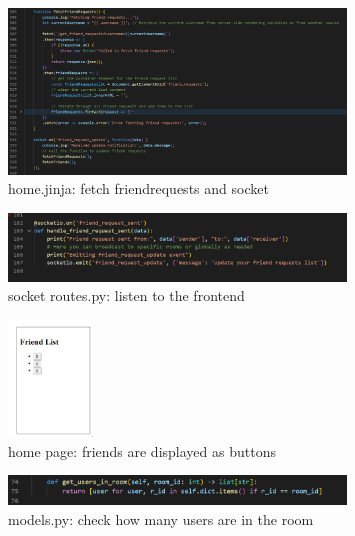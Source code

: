 \documentclass[12pt]{article}
\begin{document}
\begin{enumerate}
		\begin{figure}[H]
                \centering
                \includegraphics[width=0.8\textwidth]{zzrgraphs/home_fetchfriendrequests.png}
                \caption{home.jinja: fetch friendrequests and socket}
                \label{fetchrequests}
            \end{figure}
	
		\begin{figure}[H]
                \centering
                \includegraphics[width=0.8\textwidth]{zzrgraphs/socket_friend_request_sent.png}
                \caption{socket routes.py: listen to the frontend}
                \label{requestsocketio}
            \end{figure}

		\begin{figure}[H]
                \centering
                \includegraphics[width=0.2\textwidth]{zzrgraphs/friend_list.png}
                \caption{home page: friends are displayed as buttons}
                \label{friendlist}
            \end{figure}

		\begin{figure}[H]
                \centering
                \includegraphics[width=0.8\textwidth]{zzrgraphs/models_get_users_in_room.png}
                \caption{models.py: check how many users are in the room}
                \label{getusersinroom}
            \end{figure}


\end{enumerate}
\end{document}
